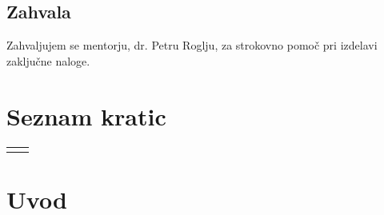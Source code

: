\documentclass[12pt,a4paper,titlepage,openany]{report}
\begin{document}

\newpage
\section*{Zahvala}

Zahvaljujem se mentorju, dr. Petru Roglju, za strokovno pomoč pri izdelavi zaključne naloge.

\newpage

\tableofcontents
{}
\newpage
\listoftables
{}
\newpage
\listoffigures
{}
\newpage
\renewcommand{\cftdot}{}
\listofappendices
\thispagestyle{fancy}
\newpage

\chapter*{Seznam kratic}
\thispagestyle{fancyplain}
\begin{longtable}{@{}p{1cm}@{}p{\dimexpr\textwidth-1cm\relax}@{}}
\nomenclature{$tj.$}{to je}
\nomenclature{$npr.$}{na primer}
\end{longtable}
\newpage

\normalsize


% 
% 

\chapter{Uvod}
\thispagestyle{fancy}
\end{document}
